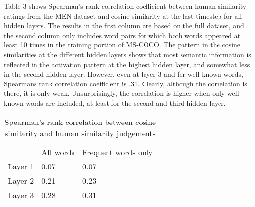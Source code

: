 Table 3 shows Spearman's rank correlation coefficient between human similarity ratings from the MEN dataset and cosine similarity at the last timestep for all hidden layers. The results in the first column are based on the full dataset, and the second column only includes word pairs for which both words appeared at least 10 times in the training portion of MS-COCO. %
The pattern in the cosine similarities at the different hidden layers shows that most semantic information is reflected in the activation pattern at the highest hidden layer, and somewhat less in the second hidden layer. However, even at layer 3 and for well-known words, Spearmans rank correlation coefficient is .31. Clearly, although the correlation is there, it is only weak.  %
Unsurprisingly, the correlation is higher when only well-known words are included, at least for the second and third hidden layer. %

\begin{table}[]
	\centering
	\caption{Spearman's rank correlation between cosine similarity and human similarity judgements} %
	\begin{tabular}{lll}
		& All words      & Frequent words only         \\
		Layer 1 & 0.07 & 0.07 \\
		Layer 2 & 0.21 & 0.23 \\
		Layer 3 & 0.28 & 0.31 
	\end{tabular}
\end{table}


